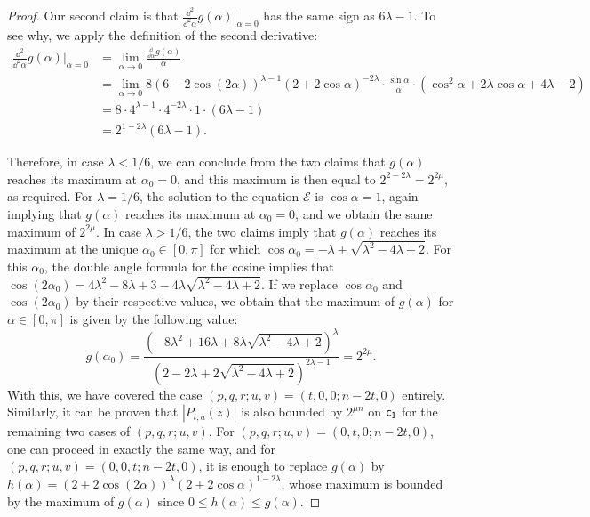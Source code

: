 \documentclass{llncs}
\begin{document}
\begin{proof}
    Our second claim is that $\frac{\dd^2}{\dd^2\alpha}g(\alpha)\vert_{\alpha=0}$ has the same sign as $6\lambda -1$. To see why, we apply the definition of the second derivative:
    \begin{align*}
        \frac{\dd^2}{\dd^2\alpha}g(\alpha)\vert_{\alpha=0}
        &=\lim_{\alpha\to 0}\frac{\frac{\dd}{\dd\alpha}g(\alpha)}{\alpha}\\
        &=\lim_{\alpha\to 0}8(6-2\cos(2\alpha))^{\lambda-1}(2+2\cos\alpha)^{-2\lambda}\cdot\frac{\sin\alpha}{\alpha}\cdot\left(\cos^2\alpha+2\lambda\cos\alpha+4\lambda-2\right)\\
        &=8\cdot4^{\lambda-1}\cdot 4^{-2\lambda}\cdot 1\cdot(6\lambda -1)\\
        &=2^{1-2\lambda}(6\lambda -1).
    \end{align*}
    
    Therefore, in case $\lambda<1/6$, we can conclude from the two claims that $g(\alpha)$ reaches its maximum at $\alpha_0=0$, and this maximum is then equal to $2^{2-2\lambda}=2^{2\mu}$, as required. For $\lambda=1/6$, the solution to the equation $\mathcal E$ is $\cos\alpha=1$, again implying that $g(\alpha)$ reaches its maximum at $\alpha_0=0$, and we obtain the same maximum of $2^{2\mu}$. In case $\lambda>1/6$, the two claims imply that $g(\alpha)$ reaches its maximum at the unique $\alpha_0\in[0,\pi]$ for which $\cos\alpha_0=-\lambda+\sqrt{\lambda^2-4\lambda+2}$. For this $\alpha_0$, the double angle formula for the cosine implies that $\cos(2\alpha_0)=4\lambda^2-8\lambda+3-4\lambda\sqrt{\lambda^2-4\lambda+2}$. If we replace $\cos\alpha_0$ and $\cos(2\alpha_0)$ by their respective values, we obtain that the maximum of $g(\alpha)$ for $\alpha\in[0,\pi]$ is given by the following value:
    \[
        g(\alpha_0)=\frac{\left(-8\lambda^2+16\lambda+8\lambda\sqrt{\lambda^2-4\lambda+2}\right)^{\lambda}}{\left(2-2\lambda+2\sqrt{\lambda^2-4\lambda+2}\right)^{2\lambda-1}}=2^{2\mu}.
    \]
    With this, we have covered the case $(p,q,r;u,v)=(t,0,0;n-2t,0)$ entirely. Similarly, it can be proven that $|P_{t,a}(z)|$ is also bounded by $2^{\mu n}$ on $\mathsf{c_1}$ for the remaining two cases of $(p,q,r;u,v)$. 
    For $(p,q,r;u,v)=(0,t,0;n-2t,0)$, one can proceed in exactly the same way, and for $(p,q,r;u,v)=(0,0,t;n-2t,0)$, it is enough to replace $g(\alpha)$ by $h(\alpha)=(2+2\cos(2\alpha))^\lambda(2+2\cos\alpha)^{1-2\lambda}$, whose maximum is bounded by the maximum of $g(\alpha)$ since $0\leq h(\alpha)\leq g(\alpha)$.
\end{proof}
\end{document}
